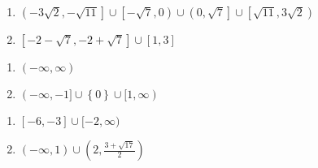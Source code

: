 \documentclass{ximera}
\begin{document}
\begin{multicols}{2}
\begin{enumerate}
\setcounter{enumi}{\value{HW}}

\item {\scriptsize $\left(-3\sqrt{2}, -\sqrt{11} \right] \cup \left[-\sqrt{7}, 0 \right) \cup \left(0, \sqrt{7} \right] \cup \left[\sqrt{11}, 3\sqrt{2} \right)$}
\item $\left[-2-\sqrt{7}, -2+\sqrt{7} \right] \cup [1, 3]$


\setcounter{HW}{\value{enumi}}
\end{enumerate}
\end{multicols}



\begin{multicols}{2}
\begin{enumerate}
\setcounter{enumi}{\value{HW}}

\item $(-\infty, \infty)$
\item  $(-\infty, -1] \cup \left\{ 0 \right\} \cup [1,\infty)$

\setcounter{HW}{\value{enumi}}
\end{enumerate}
\end{multicols}


\begin{multicols}{2}
\begin{enumerate}
\setcounter{enumi}{\value{HW}}


\item  $[-6,-3] \cup [-2, \infty)$

\item  $(-\infty, 1) \cup \left(2, \frac{3+\sqrt{17}}{2}\right)$


\setcounter{HW}{\value{enumi}}
\end{enumerate}
\end{multicols}
\end{document}
